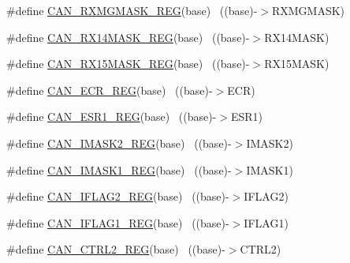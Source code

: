 \begin{DoxyCompactItemize}
\item 
\#define \hyperlink{group___c_a_n___register___accessor___macros_gadda1f2634abb5b3f2d33cd29632be22e}{C\+A\+N\+\_\+\+R\+X\+M\+G\+M\+A\+S\+K\+\_\+\+R\+EG}(base)                                  ~((base)-\/$>$R\+X\+M\+G\+M\+A\+SK)
\item 
\#define \hyperlink{group___c_a_n___register___accessor___macros_gaf9d566ee0a69baad94e2c8c8ae19b832}{C\+A\+N\+\_\+\+R\+X14\+M\+A\+S\+K\+\_\+\+R\+EG}(base)                                  ~((base)-\/$>$R\+X14\+M\+A\+SK)
\item 
\#define \hyperlink{group___c_a_n___register___accessor___macros_ga005001dc3329b0e1fb9488ebf352e109}{C\+A\+N\+\_\+\+R\+X15\+M\+A\+S\+K\+\_\+\+R\+EG}(base)                                  ~((base)-\/$>$R\+X15\+M\+A\+SK)
\item 
\#define \hyperlink{group___c_a_n___register___accessor___macros_gaea1f06ad20b64003714c92898b52e990}{C\+A\+N\+\_\+\+E\+C\+R\+\_\+\+R\+EG}(base)                                            ~((base)-\/$>$E\+CR)
\item 
\#define \hyperlink{group___c_a_n___register___accessor___macros_ga1aa0d53df307e5204e551bcd363f01e8}{C\+A\+N\+\_\+\+E\+S\+R1\+\_\+\+R\+EG}(base)                                          ~((base)-\/$>$E\+S\+R1)
\item 
\#define \hyperlink{group___c_a_n___register___accessor___macros_gade3a98dd75556ce2b6f1eb832e6e0824}{C\+A\+N\+\_\+\+I\+M\+A\+S\+K2\+\_\+\+R\+EG}(base)                                      ~((base)-\/$>$I\+M\+A\+S\+K2)
\item 
\#define \hyperlink{group___c_a_n___register___accessor___macros_ga80231dca89e90952e2e8e7b3b11da333}{C\+A\+N\+\_\+\+I\+M\+A\+S\+K1\+\_\+\+R\+EG}(base)                                      ~((base)-\/$>$I\+M\+A\+S\+K1)
\item 
\#define \hyperlink{group___c_a_n___register___accessor___macros_ga3266d1a00bf3a4fc3c464e9992bbd20c}{C\+A\+N\+\_\+\+I\+F\+L\+A\+G2\+\_\+\+R\+EG}(base)                                      ~((base)-\/$>$I\+F\+L\+A\+G2)
\item 
\#define \hyperlink{group___c_a_n___register___accessor___macros_ga516d5bdd31eb73adc70fcd9e8db6d6a7}{C\+A\+N\+\_\+\+I\+F\+L\+A\+G1\+\_\+\+R\+EG}(base)                                      ~((base)-\/$>$I\+F\+L\+A\+G1)
\item 
\#define \hyperlink{group___c_a_n___register___accessor___macros_ga3c0ddaade29c100875426d48d55b2d86}{C\+A\+N\+\_\+\+C\+T\+R\+L2\+\_\+\+R\+EG}(base)                                        ~((base)-\/$>$C\+T\+R\+L2)

\end{DoxyCompactItemize}
